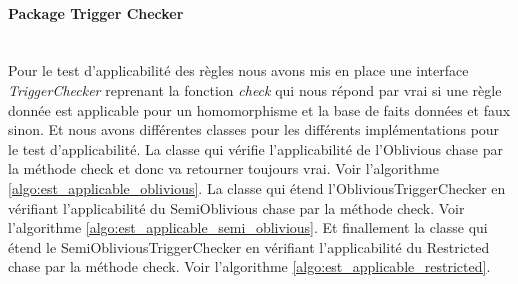     \paragraph{Package Trigger Checker}\ \\
    Pour le test d'applicabilité des règles nous avons mis en place une interface \textit{TriggerChecker} reprenant la fonction \textit{check} qui nous répond par vrai si une règle donnée est applicable pour un homomorphisme et la base de faits données et faux sinon. Et nous avons différentes classes pour les différents implémentations pour le test d'applicabilité. La classe qui vérifie l'applicabilité de l'Oblivious chase par la méthode check et donc va retourner toujours vrai. Voir l'algorithme \ref{algo:est_applicable_oblivious}. La classe qui étend l'ObliviousTriggerChecker en vérifiant l'applicabilité du SemiOblivious chase par la méthode check. Voir l'algorithme \ref{algo:est_applicable_semi_oblivious}. Et finallement la classe qui étend le SemiObliviousTriggerChecker en  vérifiant l'applicabilité du Restricted chase par la méthode check. Voir l'algorithme \ref{algo:est_applicable_restricted}.
        \\
        

